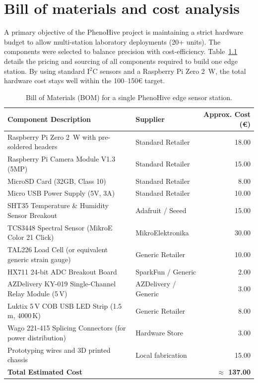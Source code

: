 ﻿\chapter{Bill of materials and cost analysis}
\label{ch:appendix-bom}

A primary objective of the PhenoHive project is maintaining a strict hardware budget to allow multi-station laboratory deployments (20+ units). The components were selected to balance precision with cost-efficiency. Table~\ref{tab:bom} details the pricing and sourcing of all components required to build one edge station. By using standard I$^2$C sensors and a Raspberry Pi Zero 2~W, the total hardware cost stays well within the 100--150€ target.


\begin{table}[htbp]
\centering
\caption[Bill of Materials for One PhenoHive Station]{Bill of Materials (BOM) for a single PhenoHive edge sensor station.}
\label{tab:bom}
\small
\renewcommand{\arraystretch}{1.2}
\begin{tabularx}{\textwidth}{|X|p{4cm}|r|}
\hline
\textbf{Component Description} & \textbf{Supplier} & \textbf{Approx. Cost (€)} \\
\hline
Raspberry Pi Zero 2~W with pre-soldered headers & Standard Retailer & 18.00 \\
\hline
Raspberry Pi Camera Module V1.3 (5MP) & Standard Retailer & 15.00 \\
\hline
MicroSD Card (32GB, Class 10) & Standard Retailer & 8.00 \\
\hline
Micro USB Power Supply (5V, 3A) & Standard Retailer & 10.00 \\
\hline
SHT35 Temperature \& Humidity Sensor Breakout & Adafruit / Seeed & 15.00 \\
\hline
TCS3448 Spectral Sensor (MikroE Color 21 Click) & MikroElektronika & 30.00 \\
\hline
TAL226 Load Cell (or equivalent generic strain gauge) & Generic Retailer & 10.00 \\
\hline
HX711 24-bit ADC Breakout Board & SparkFun / Generic & 2.00 \\
\hline
AZDelivery KY-019 Single-Channel Relay Module (5\,V) & AZDelivery / Generic & 3.00 \\
\hline
Luktix 5\,V COB USB LED Strip (1.5\,m, 4000\,K) & Generic Retailer & 8.00 \\
\hline
Wago 221-415 Splicing Connectors (for power distribution) & Hardware Store & 3.00 \\
\hline
Prototyping wires and 3D printed chassis & Local fabrication & 15.00 \\
\hline
\textbf{Total Estimated Cost} & & \textbf{$\approx$ 137.00} \\
\hline
\end{tabularx}

\end{table}


